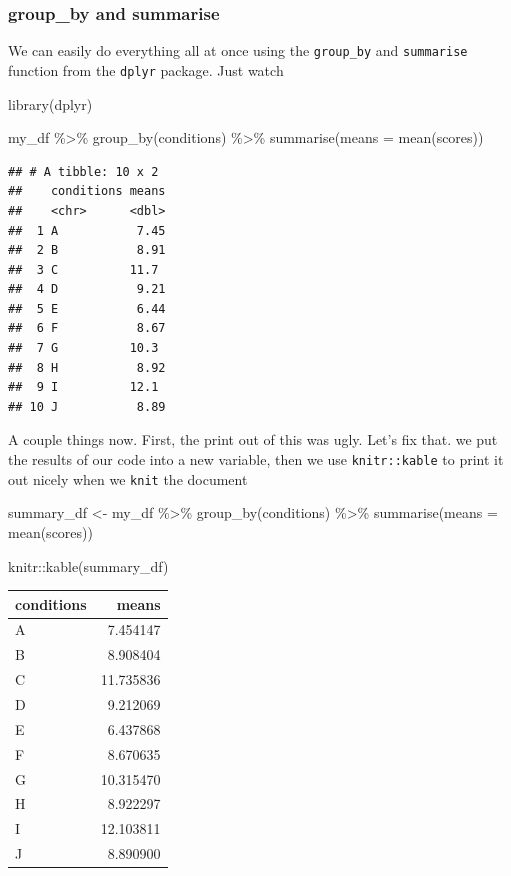 \documentclass[
]{book}
\newenvironment{Shaded}{\begin{snugshade}}{\end{snugshade}}
\newcommand{\AttributeTok}[1]{\textcolor[rgb]{0.77,0.63,0.00}{#1}}
\newcommand{\FunctionTok}[1]{\textcolor[rgb]{0.00,0.00,0.00}{#1}}
\newcommand{\NormalTok}[1]{#1}
\newcommand{\OtherTok}[1]{\textcolor[rgb]{0.56,0.35,0.01}{#1}}
\newcommand{\SpecialCharTok}[1]{\textcolor[rgb]{0.00,0.00,0.00}{#1}}
\begin{document}
\hypertarget{group_by-and-summarise}{%
\subsubsection{group\_by and summarise}\label{group_by-and-summarise}}

We can easily do everything all at once using the \texttt{group\_by} and \texttt{summarise} function from the \texttt{dplyr} package. Just watch

\begin{Shaded}
\begin{Highlighting}[]
\FunctionTok{library}\NormalTok{(dplyr)}

\NormalTok{my\_df }\SpecialCharTok{\%\textgreater{}\%}
  \FunctionTok{group\_by}\NormalTok{(conditions) }\SpecialCharTok{\%\textgreater{}\%}
  \FunctionTok{summarise}\NormalTok{(}\AttributeTok{means =} \FunctionTok{mean}\NormalTok{(scores))}
\end{Highlighting}
\end{Shaded}

\begin{verbatim}
## # A tibble: 10 x 2
##    conditions means
##    <chr>      <dbl>
##  1 A           7.45
##  2 B           8.91
##  3 C          11.7 
##  4 D           9.21
##  5 E           6.44
##  6 F           8.67
##  7 G          10.3 
##  8 H           8.92
##  9 I          12.1 
## 10 J           8.89
\end{verbatim}

A couple things now. First, the print out of this was ugly. Let's fix that. we put the results of our code into a new variable, then we use \texttt{knitr::kable} to print it out nicely when we \texttt{knit} the document

\begin{Shaded}
\begin{Highlighting}[]
\NormalTok{summary\_df }\OtherTok{\textless{}{-}}\NormalTok{ my\_df }\SpecialCharTok{\%\textgreater{}\%}
               \FunctionTok{group\_by}\NormalTok{(conditions) }\SpecialCharTok{\%\textgreater{}\%}
               \FunctionTok{summarise}\NormalTok{(}\AttributeTok{means =} \FunctionTok{mean}\NormalTok{(scores))}

\NormalTok{knitr}\SpecialCharTok{::}\FunctionTok{kable}\NormalTok{(summary\_df)}
\end{Highlighting}
\end{Shaded}

\begin{tabular}{l|r}
\hline
conditions & means\\
\hline
A & 7.454147\\
\hline
B & 8.908404\\
\hline
C & 11.735836\\
\hline
D & 9.212069\\
\hline
E & 6.437868\\
\hline
F & 8.670635\\
\hline
G & 10.315470\\
\hline
H & 8.922297\\
\hline
I & 12.103811\\
\hline
J & 8.890900\\
\hline
\end{tabular}
\end{document}

